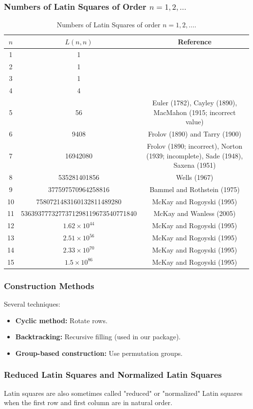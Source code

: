 \documentclass{beamer}
\begin{document}
\begin{frame}
\frametitle{Numbers of Latin Squares of Order $n=1, 2, \dots$}

\begin{table}[ht]
\centering
\begin{tabular}{|c|c|c|}
\hline
$n$ & $L(n,n)$ & Reference \\
\hline
1 & 1 & \\
2 & 1 & \\
3 & 1 & \\
4 & 4 & \\
5 & 56 & Euler (1782), Cayley (1890), MacMahon (1915; incorrect value) \\
6 & 9408 & Frolov (1890) and Tarry (1900) \\
7 & 16942080 & Frolov (1890; incorrect), Norton (1939; incomplete), Sade (1948), Saxena (1951) \\
8 & 535281401856 & Wells (1967) \\
9 & 377597570964258816 & Bammel and Rothstein (1975) \\
10 & 7580721483160132811489280 & McKay and Rogoyski (1995) \\
11 & 5363937773277371298119673540771840 & McKay and Wanless (2005) \\
12 & $1.62 \times 10^{44}$ & McKay and Rogoyski (1995) \\
13 & $2.51 \times 10^{56}$ & McKay and Rogoyski (1995) \\
14 & $2.33 \times 10^{70}$ & McKay and Rogoyski (1995) \\
15 & $1.5 \times 10^{86}$ & McKay and Rogoyski (1995) \\
\hline
\end{tabular}
\caption{Numbers of Latin Squares of order $n=1, 2, \dots$.}
\end{table}

\begin{frame}
\frametitle{Construction Methods}
Several techniques:
\begin{itemize}
  \item \textbf{Cyclic method:} Rotate rows.
  \item \textbf{Backtracking:} Recursive filling (used in our package).
  \item \textbf{Group-based construction:} Use permutation groups.
\end{itemize}
\end{frame}

\begin{frame}
\frametitle{Reduced Latin Squares and Normalized Latin Squares}
Latin squares are also sometimes called "reduced" or "normalized" Latin squares when the first row and first column are in natural order. 
\end{frame}


\end{frame}
\end{document}
